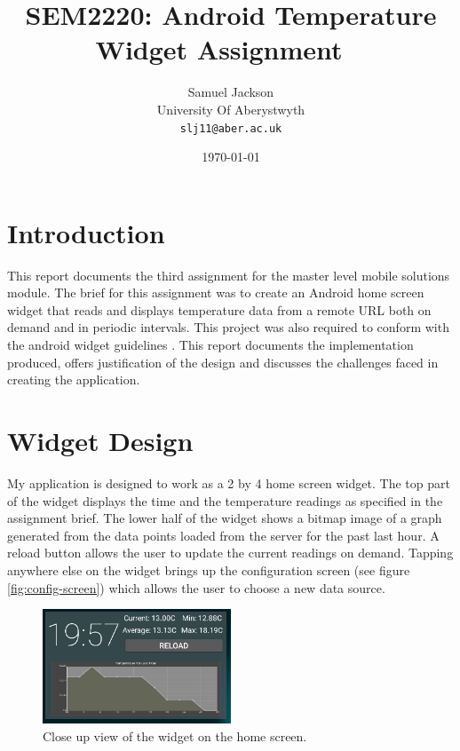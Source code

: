 \documentclass[paper=a4, fontsize=11pt]{scrartcl}	%
\title{
	\vspace{-0.5in} 	\usefont{OT1}{bch}{b}{n}
        SEM2220: Android Temperature Widget Assignment \
}
\author{
	\usefont{OT1}{bch}{m}{n} Samuel Jackson
	\\ \usefont{OT1}{bch}{m}{n} University Of Aberystwyth
	\\   \texttt{slj11@aber.ac.uk}
}
\date{\today}
\numberwithin{equation}{section}															%
\numberwithin{figure}{section}																%
\numberwithin{table}{section}
\begin{document}
\maketitle

\clearpage

\section{Introduction}
This report documents the third assignment for the master level mobile solutions module. The brief for this assignment was to create an Android home screen widget that reads and displays temperature data from a remote URL both on demand and in periodic intervals. This project was also required to conform with the android widget guidelines \cite{android-widget-guidelines}. This report documents the implementation produced, offers justification of the design and discusses the challenges faced in creating the application.

\section{Widget Design}
My application is designed to work as a 2 by 4 home screen widget. The top part of the widget displays the time and the temperature readings as specified in the assignment brief. The lower half of the widget shows a bitmap image of a graph generated from the data points loaded from the server for the past last hour. A reload button allows the user to update the current readings on demand. Tapping anywhere else on the widget brings up the configuration screen (see figure \ref{fig:config-screen}) which allows the user to choose a new data source.

\begin{figure}[ht]
\centering
\includegraphics[width=0.5\textwidth]{img/closeup-screenshot.png}
\caption{Close up view of the widget on the home screen.}
\label{fig:closeup}
\end{figure}
\end{document}
